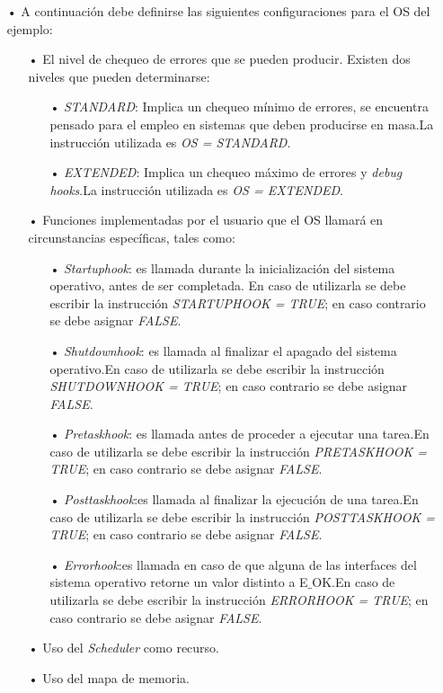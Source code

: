 \documentclass[12pt,letterpaper]{article}
\begin{document}
\begin{enumerate}
\item[•]A continuación debe definirse las siguientes configuraciones para el OS del ejemplo:
\begin{enumerate}
\item[•]El nivel de chequeo de errores que se pueden producir. Existen dos niveles que pueden determinarse:
\begin{enumerate}
\item[•]\textit{STANDARD}: Implica un chequeo mínimo de errores, se encuentra pensado para el empleo en sistemas que deben producirse en masa.La instrucción utilizada es \textit{OS = STANDARD}. 
\item[•]\textit{EXTENDED}: Implica un chequeo máximo de errores y \textit{debug hooks}.La instrucción utilizada es \textit{OS = EXTENDED}.
\end{enumerate}
\item[•]Funciones implementadas por el usuario que el OS llamará en circunstancias específicas, tales como:
\begin{enumerate}
\item[•]\textit{Startuphook}: es  llamada  durante  la  inicialización  del  sistema  operativo,  antes  de  ser completada. En caso de utilizarla se debe escribir la instrucción \textit{STARTUPHOOK = TRUE}; en caso contrario se debe asignar \textit{FALSE}.
\item[•]\textit{Shutdownhook}: es llamada al finalizar el apagado del sistema operativo.En caso de utilizarla se debe escribir la instrucción \textit{SHUTDOWNHOOK = TRUE}; en caso contrario se debe asignar \textit{FALSE}.
\item[•]\textit{Pretaskhook}: es llamada antes de proceder a ejecutar una tarea.En caso de utilizarla se debe escribir la instrucción \textit{PRETASKHOOK = TRUE}; en caso contrario se debe asignar \textit{FALSE}.
\item[•]\textit{Posttaskhook}:es llamada al finalizar la ejecución de una tarea.En caso de utilizarla se debe escribir la instrucción \textit{POSTTASKHOOK = TRUE}; en caso contrario se debe asignar \textit{FALSE}.
\item[•]\textit{Errorhook}:es llamada en caso de que alguna de las interfaces del sistema operativo retorne un valor distinto a E$\_$OK.En caso de utilizarla se debe escribir la instrucción \textit{ERRORHOOK = TRUE}; en caso contrario se debe asignar \textit{FALSE}.
\end{enumerate}
\item[•]Uso del \textit{Scheduler} como recurso.
\item[•]Uso del mapa de memoria.

\end{enumerate}
\end{enumerate}
\end{document}
